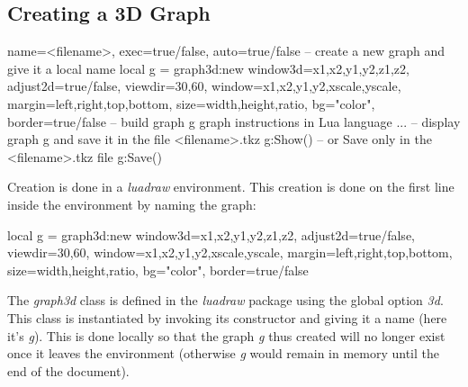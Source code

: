 \subsection{Creating a 3D Graph}

\begin{TeXcode}
\begin{luadraw}{ name=<filename>, exec=true/false, auto=true/false }
-- create a new graph and give it a local name
local g = graph3d:new{ window3d={x1,x2,y1,y2,z1,z2}, adjust2d=true/false, viewdir={30,60}, window={x1,x2,y1,y2,xscale,yscale}, margin={left,right,top,bottom}, size={width,height,ratio}, bg="color", border=true/false }
-- build graph g
graph instructions in Lua language ...
-- display graph g and save it in the file <filename>.tkz
g:Show()
-- or Save only in the <filename>.tkz file
g:Save()
\end{luadraw}
\end{TeXcode}

Creation is done in a \emph{luadraw} environment. This creation is done on the first line inside the environment by naming the graph:

\begin{Luacode}
local g = graph3d:new{ window3d={x1,x2,y1,y2,z1,z2}, adjust2d=true/false, viewdir={30,60}, window={x1,x2,y1,y2,xscale,yscale}, margin={left,right,top,bottom}, size={width,height,ratio}, bg="color", border=true/false }
\end{Luacode}

The \emph{graph3d} class is defined in the \emph{luadraw} package using the global option \emph{3d}. This class is instantiated by invoking its constructor and giving it a name (here it's \emph{g}). This is done locally so that the graph \emph{g} thus created will no longer exist once it leaves the environment (otherwise \emph{g} would remain in memory until the end of the document).

